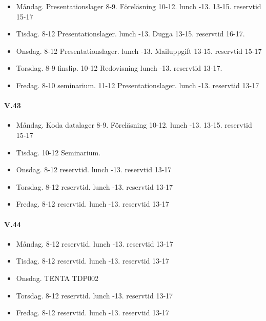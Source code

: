 \documentclass{article}
\begin{document}
\begin{itemize}
\item	Måndag. Presentationslager 8-9. Föreläsning 10-12. lunch -13.  13-15. reservtid 15-17 

\item	Tisdag. 8-12 Presentationslager. lunch -13. Dugga 13-15. reservtid 16-17.

\item	Onsdag. 8-12 Presentationslager. lunch -13. Mailuppgift 13-15. reservtid 15-17

\item	Torsdag. 8-9 finslip. 10-12 Redovisning lunch -13. reservtid 13-17.

\item	Fredag. 8-10 seminarium. 11-12 Presentationslager. lunch -13. reservtid 13-17
\end{itemize}

\paragraph{V.43}

\begin{itemize}
\item	Måndag. Koda datalager 8-9. Föreläsning 10-12. lunch -13.  13-15. reservtid 15-17 

\item	Tisdag. 10-12 Seminarium.

\item	Onsdag. 8-12 reservtid. lunch -13. reservtid 13-17

\item	Torsdag. 8-12 reservtid. lunch -13. reservtid 13-17

\item	Fredag. 8-12 reservtid. lunch -13. reservtid 13-17
\end{itemize}


\paragraph{V.44}

\begin{itemize}
\item	Måndag. 8-12 reservtid. lunch -13. reservtid 13-17 

\item	Tisdag. 8-12 reservtid. lunch -13. reservtid 13-17

\item	Onsdag. TENTA TDP002

\item	Torsdag. 8-12 reservtid. lunch -13. reservtid 13-17

\item	Fredag. 8-12 reservtid. lunch -13. reservtid 13-17
\end{itemize}
\end{document}
